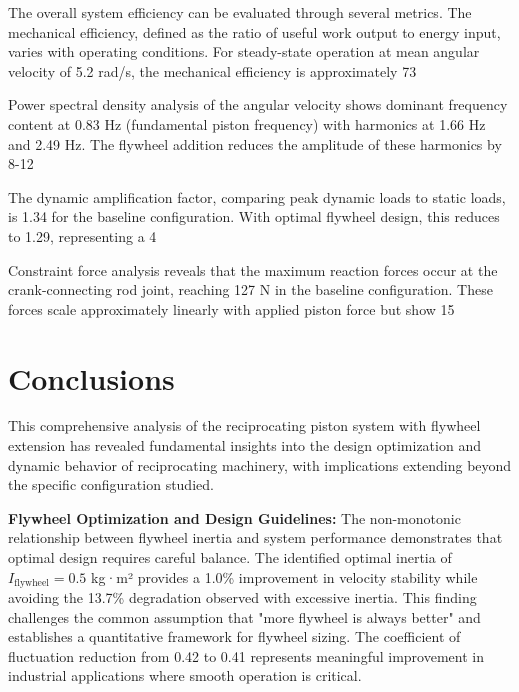 \documentclass[10pt]{article}
\begin{document}
The overall system efficiency can be evaluated through several metrics. The mechanical efficiency, defined as the ratio of useful work output to energy input, varies with operating conditions. For steady-state operation at mean angular velocity of 5.2 rad/s, the mechanical efficiency is approximately 73%

Power spectral density analysis of the angular velocity shows dominant frequency content at 0.83 Hz (fundamental piston frequency) with harmonics at 1.66 Hz and 2.49 Hz. The flywheel addition reduces the amplitude of these harmonics by 8-12%

The dynamic amplification factor, comparing peak dynamic loads to static loads, is 1.34 for the baseline configuration. With optimal flywheel design, this reduces to 1.29, representing a 4%

Constraint force analysis reveals that the maximum reaction forces occur at the crank-connecting rod joint, reaching 127 N in the baseline configuration. These forces scale approximately linearly with applied piston force but show 15%

\section{Conclusions}

This comprehensive analysis of the reciprocating piston system with flywheel extension has revealed fundamental insights into the design optimization and dynamic behavior of reciprocating machinery, with implications extending beyond the specific configuration studied.

\textbf{Flywheel Optimization and Design Guidelines:} The non-monotonic relationship between flywheel inertia and system performance demonstrates that optimal design requires careful balance. The identified optimal inertia of $I_{\text{flywheel}} = 0.5$ kg·m² provides a 1.0\% improvement in velocity stability while avoiding the 13.7\% degradation observed with excessive inertia. This finding challenges the common assumption that "more flywheel is always better" and establishes a quantitative framework for flywheel sizing. The coefficient of fluctuation reduction from 0.42 to 0.41 represents meaningful improvement in industrial applications where smooth operation is critical.
\end{document}
